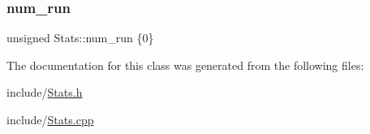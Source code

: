 \subsubsection{\texorpdfstring{num\+\_\+run}{num\_run}}
{\footnotesize\ttfamily unsigned Stats\+::num\+\_\+run \{0\}}



The documentation for this class was generated from the following files\+:\begin{DoxyCompactItemize}
\item 
include/\hyperlink{_stats_8h}{Stats.\+h}\item 
include/\hyperlink{_stats_8cpp}{Stats.\+cpp}\end{DoxyCompactItemize}
